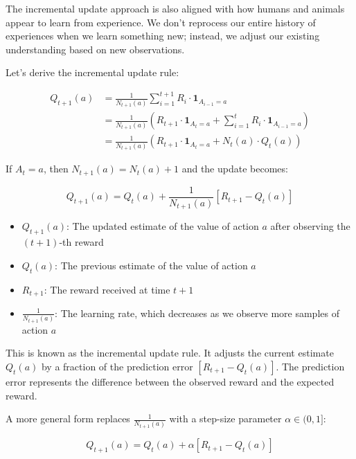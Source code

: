 \documentclass{article}
\begin{document}
The incremental update approach is also aligned with how humans and animals appear to learn from experience. We don't reprocess our entire history of experiences when we learn something new; instead, we adjust our existing understanding based on new observations.

Let's derive the incremental update rule:

\begin{align}
    Q_{t+1}(a) &= \frac{1}{N_{t+1}(a)} \sum_{i=1}^{t+1} R_i \cdot \mathbf{1}_{A_{i-1}=a} \\
    &= \frac{1}{N_{t+1}(a)} \left( R_{t+1} \cdot \mathbf{1}_{A_{t}=a} + \sum_{i=1}^{t} R_i \cdot \mathbf{1}_{A_{i-1}=a} \right) \\
    &= \frac{1}{N_{t+1}(a)} \left( R_{t+1} \cdot \mathbf{1}_{A_{t}=a} + N_t(a) \cdot Q_t(a) \right)
\end{align}

If $A_{t} = a$, then $N_{t+1}(a) = N_t(a) + 1$ and the update becomes:

\begin{equation}
    Q_{t+1}(a) = Q_t(a) + \frac{1}{N_{t+1}(a)} [R_{t+1} - Q_t(a)]
\end{equation}

\begin{tcolorbox}[colback=blue!5!white,colframe=blue!75!black,title=Notation Overview]
\begin{itemize}
    \item $Q_{t+1}(a)$: The updated estimate of the value of action $a$ after observing the $(t+1)$-th reward
    \item $Q_t(a)$: The previous estimate of the value of action $a$
    \item $R_{t+1}$: The reward received at time $t+1$
    \item $\frac{1}{N_{t+1}(a)}$: The learning rate, which decreases as we observe more samples of action $a$
\end{itemize}
\end{tcolorbox}

This is known as the incremental update rule. It adjusts the current estimate $Q_t(a)$ by a fraction of the prediction error $[R_{t+1} - Q_t(a)]$. The prediction error represents the difference between the observed reward and the expected reward.

A more general form replaces $\frac{1}{N_{t+1}(a)}$ with a step-size parameter $\alpha \in (0,1]$:

\begin{equation}
    Q_{t+1}(a) = Q_t(a) + \alpha [R_{t+1} - Q_t(a)]
\end{equation}
\end{document}

